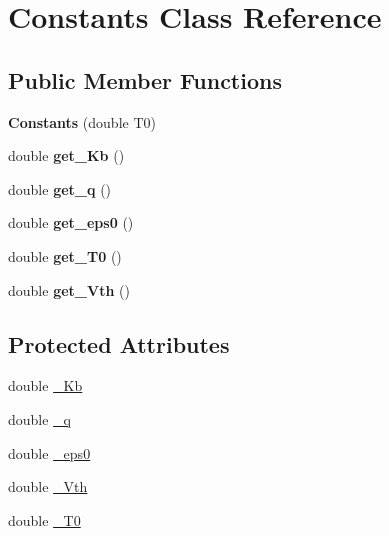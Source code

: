 \hypertarget{classConstants}{\section{Constants Class Reference}
\label{classConstants}
}
\subsection*{Public Member Functions}
\begin{DoxyCompactItemize}
\item 
\hypertarget{classConstants_a217a6cf09f774b31ce0156e2445292cb}{{\bfseries Constants} (double T0)}\label{classConstants_a217a6cf09f774b31ce0156e2445292cb}

\item 
\hypertarget{classConstants_a379611fa7c48c1d4f29cf2b60adf5972}{double {\bfseries get\-\_\-\-Kb} ()}\label{classConstants_a379611fa7c48c1d4f29cf2b60adf5972}

\item 
\hypertarget{classConstants_ad5969538fab35ef9f8a8b7d5b4ebc085}{double {\bfseries get\-\_\-q} ()}\label{classConstants_ad5969538fab35ef9f8a8b7d5b4ebc085}

\item 
\hypertarget{classConstants_a030c5e66d7434082a6bb237f8e0398cc}{double {\bfseries get\-\_\-eps0} ()}\label{classConstants_a030c5e66d7434082a6bb237f8e0398cc}

\item 
\hypertarget{classConstants_a55be859f53cdad6c9bb24baec2f263bf}{double {\bfseries get\-\_\-\-T0} ()}\label{classConstants_a55be859f53cdad6c9bb24baec2f263bf}

\item 
\hypertarget{classConstants_a9c45859c4c2cd56aa9ed0c9493eb9069}{double {\bfseries get\-\_\-\-Vth} ()}\label{classConstants_a9c45859c4c2cd56aa9ed0c9493eb9069}

\end{DoxyCompactItemize}
\subsection*{Protected Attributes}
\begin{DoxyCompactItemize}
\item 
double \hyperlink{classConstants_aae81270bc82f2f8866704ed833295d28}{\-\_\-\-Kb}
\item 
double \hyperlink{classConstants_a6b6647b66be15994cc6d061f8158efaf}{\-\_\-q}
\item 
double \hyperlink{classConstants_a8a3a4e3e37b672469a97448273a4ac04}{\-\_\-eps0}
\item 
double \hyperlink{classConstants_a174ac7aef72e5eabc597bcc26c4c9455}{\-\_\-\-Vth}
\item 
double \hyperlink{classConstants_a649cd6bddf45790762578d642f416fdc}{\-\_\-\-T0}
\end{DoxyCompactItemize}
